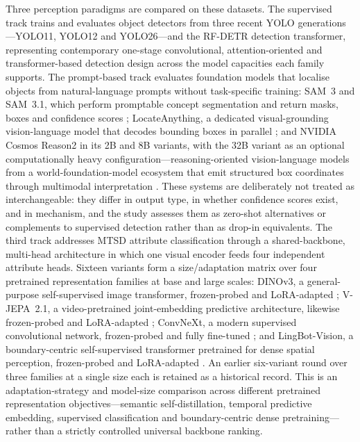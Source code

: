 Three perception paradigms are compared on these datasets. The supervised track trains and evaluates object detectors from three recent YOLO generations---YOLO11, YOLO12 and YOLO26---and the RF-DETR detection transformer, representing contemporary one-stage convolutional, attention-oriented and transformer-based detection design across the model capacities each family supports. The prompt-based track evaluates foundation models that localise objects from natural-language prompts without task-specific training: SAM~3 and SAM~3.1, which perform promptable concept segmentation and return masks, boxes and confidence scores \citep{meta2025sam3,meta2026sam31}; LocateAnything, a dedicated visual-grounding vision-language model that decodes bounding boxes in parallel \citep{nvidia2026locateanything}; and NVIDIA Cosmos Reason2 in its 2B and 8B variants, with the 32B variant as an optional computationally heavy configuration---reasoning-oriented vision-language models from a world-foundation-model ecosystem that emit structured box coordinates through multimodal interpretation \citep{nvidia2025cosmosreason2,nvidia2025cosmosplatform}. These systems are deliberately not treated as interchangeable: they differ in output type, in whether confidence scores exist, and in mechanism, and the study assesses them as zero-shot alternatives or complements to supervised detection rather than as drop-in equivalents. The third track addresses MTSD attribute classification through a shared-backbone, multi-head architecture in which one visual encoder feeds four independent attribute heads. Sixteen variants form a size/adaptation matrix over four pretrained representation families at base and large scales: DINOv3, a general-purpose self-supervised image transformer, frozen-probed and LoRA-adapted \citep{simeoni2025dinov3,hu2022lora}; V-JEPA~2.1, a video-pretrained joint-embedding predictive architecture, likewise frozen-probed and LoRA-adapted \citep{murlabadia2026vjepa21}; ConvNeXt, a modern supervised convolutional network, frozen-probed and fully fine-tuned \citep{liu2022convnet}; and LingBot-Vision, a boundary-centric self-supervised transformer pretrained for dense spatial perception, frozen-probed and LoRA-adapted \citep{fu2026lingbot}. An earlier six-variant round over three families at a single size each is retained as a historical record. This is an adaptation-strategy and model-size comparison across different pretrained representation objectives---semantic self-distillation, temporal predictive embedding, supervised classification and boundary-centric dense pretraining---rather than a strictly controlled universal backbone ranking.

